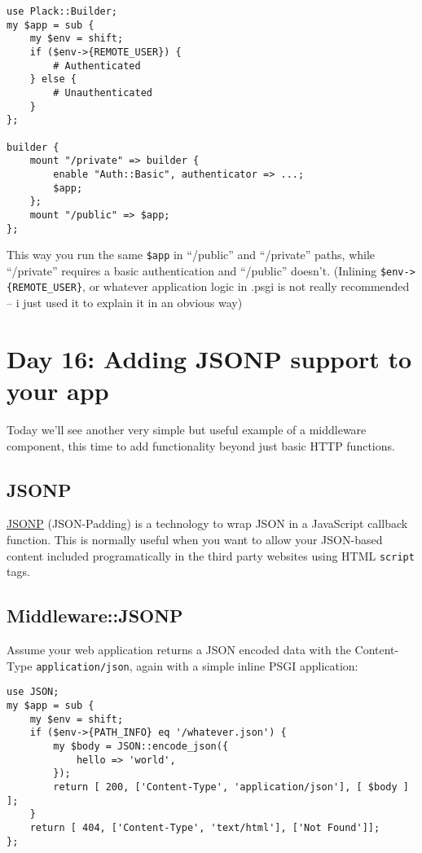 \begin{lstlisting}
use Plack::Builder;
my $app = sub {
    my $env = shift;
    if ($env->{REMOTE_USER}) { 
        # Authenticated
    } else {
        # Unauthenticated
    }
};

builder {
    mount "/private" => builder {
        enable "Auth::Basic", authenticator => ...;
        $app;
    };
    mount "/public" => $app;
};
\end{lstlisting}

This way you run the same \lstinline!$app! in ``/public'' and
``/private'' paths, while ``/private'' requires a basic authentication
and ``/public'' doesn't. (Inlining \lstinline!$env->{REMOTE_USER}!, or
whatever application logic in .psgi is not really recommended -- i just
used it to explain it in an obvious way)

\section{Day 16: Adding JSONP support to your
app}\label{day-16-adding-jsonp-support-to-your-app}

Today we'll see another very simple but useful example of a middleware
component, this time to add functionality beyond just basic HTTP
functions.

\subsection{JSONP}\label{jsonp}

\href{http://ajaxian.com/archives/jsonp-json-with-padding}{JSONP}
(JSON-Padding) is a technology to wrap JSON in a JavaScript callback
function. This is normally useful when you want to allow your JSON-based
content included programatically in the third party websites using HTML
\lstinline!script! tags.

\subsection{Middleware::JSONP}\label{middlewarejsonp}

Assume your web application returns a JSON encoded data with the
Content-Type \lstinline!application/json!, again with a simple inline
PSGI application:

\begin{lstlisting}
use JSON;
my $app = sub {
    my $env = shift;
    if ($env->{PATH_INFO} eq '/whatever.json') {
        my $body = JSON::encode_json({
            hello => 'world',
        });
        return [ 200, ['Content-Type', 'application/json'], [ $body ] ];
    }
    return [ 404, ['Content-Type', 'text/html'], ['Not Found']];
};
\end{lstlisting}

